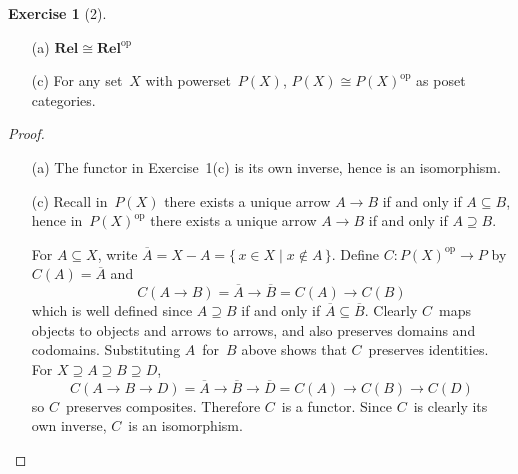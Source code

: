 \documentclass[letterpaper,12pt]{article}
\newcommand{\iso}{\cong}
\newcommand{\comp}[1]{\overline{#1}}
\newcommand{\cat}[1]{\mathbf{#1}}
\newcommand{\dual}[1]{#1^{\mathrm{op}}}
\newcommand{\Rel}{\cat{Rel}}
\newcommand{\Relop}{\dual{\Rel}}
\theoremstyle{definition}
\newtheorem*{exer}{Exercise}
\theoremstyle{remark}
\theoremstyle{direction}
\begin{document}
\begin{exer}[2]\
\begin{enumerate}[itemsep=0pt]
\item[(a)] \(\Rel\iso\Relop\)
\item[(c)] For any set~\(X\) with powerset~\(P(X)\), \(P(X)\iso\dual{P(X)}\) as poset categories.
\end{enumerate}
\begin{proof}\
\begin{enumerate}[itemsep=0pt]
\item[(a)] The functor in Exercise~1(c) is its own inverse, hence is an isomorphism.
\item[(c)] Recall in~\(P(X)\) there exists a unique arrow \(A\to B\) if and only if \(A\subseteq B\), hence in~\(\dual{P(X)}\) there exists a unique arrow \(A\to B\) if and only if \(A\supseteq B\).

For \(A\subseteq X\), write \(\comp{A}=X-A=\{\,x\in X\mid x\not\in A\,\}\). Define \(C:\dual{P(X)}\to P\) by \(C(A)=\comp{A}\) and
\[C(A\to B)=\comp{A}\to\comp{B}=C(A)\to C(B)\]
which is well defined since \(A\supseteq B\) if and only if \(\comp{A}\subseteq\comp{B}\). Clearly \(C\)~maps objects to objects and arrows to arrows, and also preserves domains and codomains. Substituting \(A\)~for~\(B\) above shows that \(C\)~preserves identities. For \(X\supseteq A\supseteq B\supseteq D\),
\[C(A\to B\to D)=\comp{A}\to\comp{B}\to\comp{D}=C(A)\to C(B)\to C(D)\]
so \(C\)~preserves composites. Therefore \(C\)~is a functor. Since \(C\)~is clearly its own inverse, \(C\)~is an isomorphism.\qedhere
\end{enumerate}
\end{proof}
\end{exer}
\end{document}
